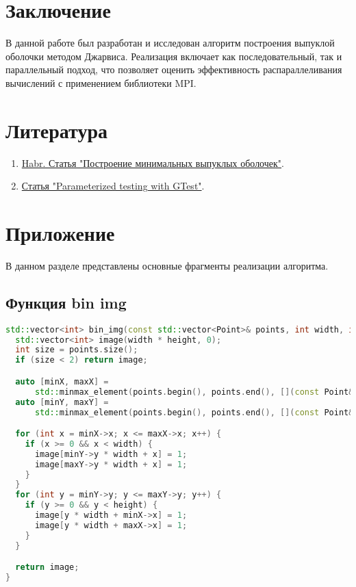 \documentclass[12pt]{article}
\begin{document}
\section*{Заключение}
В данной работе был разработан и исследован алгоритм построения выпуклой оболочки методом Джарвиса. Реализация включает как последовательный, так и параллельный подход, что позволяет оценить эффективность распараллеливания вычислений с применением библиотеки MPI.
\newpage
\section*{Литература}

\begin{enumerate}
    \item \href{https://habr.com/ru/articles/144921/}{Habr. Статья "Построение минимальных выпуклых оболочек"}.
    \item \href{https://dev.to/sandordargo/parameterized-testing-with-gtest-50l9?ysclid=m4za95jfss441200494}{Статья "Parameterized testing with GTest"}.
\end{enumerate}

\appendix
\newpage
\section*{Приложение}

В данном разделе представлены основные фрагменты реализации алгоритма.

\subsection*{Функция bin img}

\begin{lstlisting}[language=C++]
std::vector<int> bin_img(const std::vector<Point>& points, int width, int height) {
  std::vector<int> image(width * height, 0);
  int size = points.size();
  if (size < 2) return image;

  auto [minX, maxX] =
      std::minmax_element(points.begin(), points.end(), [](const Point& a, const Point& b) { return a.x < b.x; });
  auto [minY, maxY] =
      std::minmax_element(points.begin(), points.end(), [](const Point& a, const Point& b) { return a.y < b.y; });

  for (int x = minX->x; x <= maxX->x; x++) {
    if (x >= 0 && x < width) {
      image[minY->y * width + x] = 1;
      image[maxY->y * width + x] = 1;
    }
  }
  for (int y = minY->y; y <= maxY->y; y++) {
    if (y >= 0 && y < height) {
      image[y * width + minX->x] = 1;
      image[y * width + maxX->x] = 1;
    }
  }

  return image;
}
\end{lstlisting}
\end{document}
